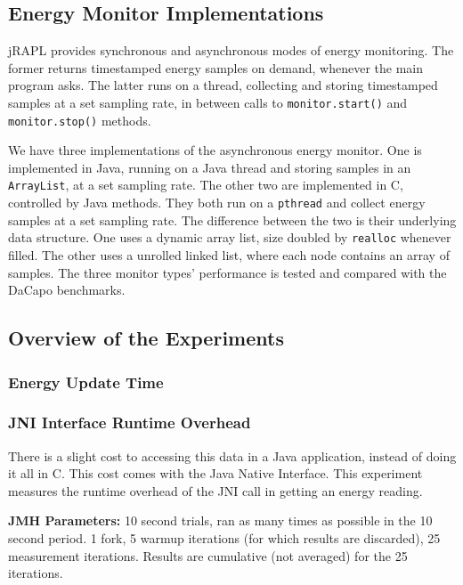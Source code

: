 \subsection{Energy Monitor Implementations}

jRAPL provides synchronous and asynchronous modes of energy monitoring. The former returns timestamped energy samples on demand, whenever the main program asks. The latter runs on a thread, collecting and storing timestamped samples at a set sampling rate, in between calls to \texttt{monitor.start()} and \texttt{monitor.stop()} methods.

We have three implementations of the asynchronous energy monitor. One is implemented in Java, running on a Java thread and storing samples in an \texttt{ArrayList}, at a set sampling rate. The other two are implemented in C, controlled by Java methods. They both run on a \texttt{pthread} and collect energy samples at a set sampling rate. The difference between the two is their underlying data structure. One uses a dynamic array list, size doubled by \texttt{realloc} whenever filled. The other uses a unrolled linked list, where each node contains an array of samples. The three monitor types' performance is tested and compared with the DaCapo benchmarks.

\subsection{Overview of the Experiments}

\subsubsection{Energy Update Time}

\subsubsection{JNI Interface Runtime Overhead}
    There is a slight cost to accessing this data in a Java application, instead of doing it all in C. This cost comes with the Java Native Interface. This experiment measures the runtime overhead of the JNI call in getting an energy reading.
    
    \textbf{JMH Parameters:} 10 second trials, ran as many times as possible in the 10 second period. 1 fork, 5 warmup iterations (for which results are discarded), 25 measurement iterations. Results are cumulative (not averaged) for the 25 iterations.
    
